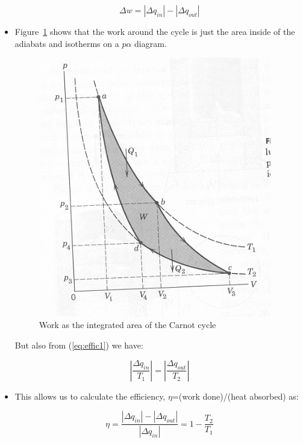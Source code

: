 \documentclass[12pt]{article}
\begin{document}
\begin{itemize}
  \begin{equation}
    \label{eq:cycle}
    \Delta w = | \Delta q_{in} | - | \Delta q_{out} |
  \end{equation}



\item Figure~\ref{fig:carnottrim} shows that the work around the
cycle is just the area inside of the adiabats and isotherms on
a $p\alpha$ diagram.

 \begin{figure}[htbp]
    \includegraphics[width=4in]{carnottrim.png}
    \caption{Work as the integrated area of the Carnot cycle}
    \label{fig:carnottrim}
  \end{figure}


But also from (\ref{eq:effic1}) we have:

  \begin{equation}
    \label{eq:cycle2}
\left |  \frac{\Delta q_{in}}{T_1} \right | = \left |  \frac{\Delta q_{out}}{T_2} \right |
  \end{equation}


 

\item This allows us to calculate the efficiency, $\eta$=(work done)/(heat absorbed) as:

  \begin{equation}
    \label{eq:eta}
    \eta=   \frac{ |\Delta q_{in}|- |{\Delta q_{out}}|}{|\Delta q_{in}|}= 1 -\frac{T_2}{T_1}
  \end{equation}
\end{itemize}
\end{document}
